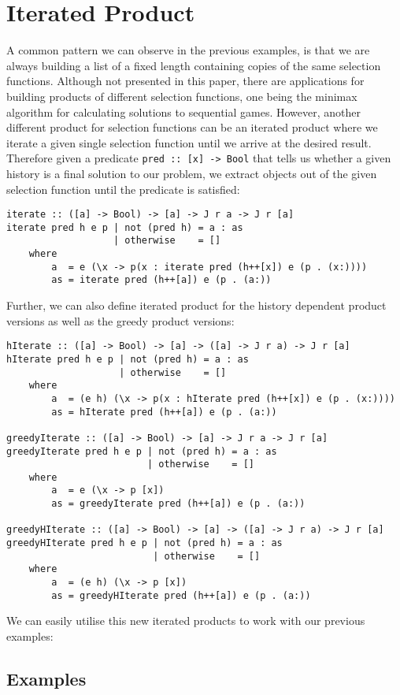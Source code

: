 \documentclass[runningheads]{llncs}
\begin{document}
\section{Iterated Product}
\label{Iterated Product}
A common pattern we can observe in the previous examples, is that we are always building a list of a fixed length containing copies of the same selection functions. Although not presented in this paper, there are applications for building products of different selection functions, one being the minimax algorithm for calculating solutions to sequential games. However, another different product for selection functions can be an iterated product where we iterate a given single selection function until we arrive at the desired result. Therefore given a predicate \texttt{pred :: [x] -> Bool} that tells us whether a given history is a final solution to our problem, we extract objects out of the given selection function until the predicate is satisfied: 
\begin{verbatim}
iterate :: ([a] -> Bool) -> [a] -> J r a -> J r [a]
iterate pred h e p | not (pred h) = a : as
                   | otherwise    = []
    where
        a  = e (\x -> p(x : iterate pred (h++[x]) e (p . (x:))))
        as = iterate pred (h++[a]) e (p . (a:))
\end{verbatim}
Further, we can also define iterated product for the history dependent product versions as well as the greedy product versions:
\begin{verbatim}
hIterate :: ([a] -> Bool) -> [a] -> ([a] -> J r a) -> J r [a]
hIterate pred h e p | not (pred h) = a : as
                    | otherwise    = []
    where
        a  = (e h) (\x -> p(x : hIterate pred (h++[x]) e (p . (x:))))
        as = hIterate pred (h++[a]) e (p . (a:))

greedyIterate :: ([a] -> Bool) -> [a] -> J r a -> J r [a]
greedyIterate pred h e p | not (pred h) = a : as
                         | otherwise    = []
    where
        a  = e (\x -> p [x])
        as = greedyIterate pred (h++[a]) e (p . (a:))

greedyHIterate :: ([a] -> Bool) -> [a] -> ([a] -> J r a) -> J r [a]
greedyHIterate pred h e p | not (pred h) = a : as
                          | otherwise    = []
    where
        a  = (e h) (\x -> p [x])
        as = greedyHIterate pred (h++[a]) e (p . (a:))
\end{verbatim}
We can easily utilise this new iterated products to work with our previous examples:
\subsection{Examples}
\end{document}
